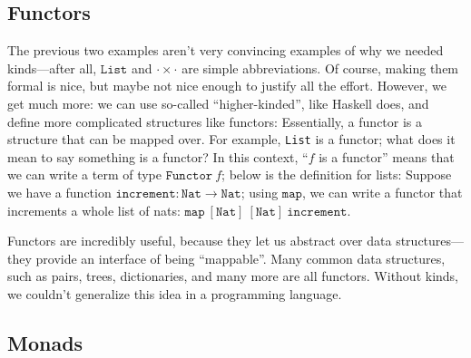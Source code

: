 \documentclass[10pt]{article}
\begin{document}
\subsection{Functors}

The previous two examples aren't very convincing examples of why we needed kinds---after all, $\texttt{List}$ and $\cdot \times \cdot$ are simple abbreviations.
Of course, making them formal is nice, but maybe not nice enough to justify all the effort.
However, we get much more: we can use so-called ``higher-kinded'', like Haskell does, and define more complicated structures like functors:
Essentially, a functor is a structure that can be mapped over.
For example, \texttt{List} is a functor; what does it mean to say something is a functor?
In this context, ``$f$ is a functor'' means that we can write a term of type $\texttt{Functor}~f$; below is the definition for lists:
Suppose we have a function $\texttt{increment} : \texttt{Nat} \to \texttt{Nat}$; using $\texttt{map}$, we can write a functor that increments a whole list of nats: $\texttt{map}~[\texttt{Nat}]~[\texttt{Nat}] ~ \texttt{increment}$.

Functors are incredibly useful, because they let us abstract over data structures---they provide an interface of being ``mappable''.
Many common data structures, such as pairs, trees, dictionaries, and many more are all functors.
Without kinds, we couldn't generalize this idea in a programming language.

\subsection{Monads}
\end{document}
